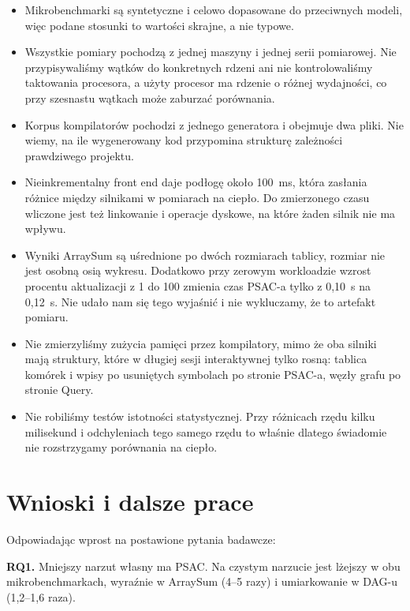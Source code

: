 \documentclass[11pt,a4paper]{article}
\begin{document}
\begin{itemize}
  \item Mikrobenchmarki są syntetyczne i celowo dopasowane do przeciwnych modeli,
        więc podane stosunki to wartości skrajne, a nie typowe.
  \item Wszystkie pomiary pochodzą z jednej maszyny i jednej serii pomiarowej.
        Nie przypisywaliśmy wątków do konkretnych rdzeni ani nie kontrolowaliśmy
        taktowania procesora, a użyty procesor ma rdzenie o różnej wydajności,
        co przy szesnastu wątkach może zaburzać porównania.
  \item Korpus kompilatorów pochodzi z jednego generatora i obejmuje dwa pliki.
        Nie wiemy, na ile wygenerowany kod przypomina strukturę zależności
        prawdziwego projektu.
  \item Nieinkrementalny front end daje podłogę około 100~ms, która zasłania
        różnice między silnikami w pomiarach na ciepło. Do zmierzonego czasu
        wliczone jest też linkowanie i operacje dyskowe, na które żaden silnik
        nie ma wpływu.
  \item Wyniki ArraySum są uśrednione po dwóch rozmiarach tablicy, rozmiar nie
        jest osobną osią wykresu. Dodatkowo przy zerowym workloadzie wzrost
        procentu aktualizacji z 1 do 100 zmienia czas PSAC-a tylko z 0,10~s na
        0,12~s. Nie udało nam się tego wyjaśnić i nie wykluczamy, że to artefakt
        pomiaru.
  \item Nie zmierzyliśmy zużycia pamięci przez kompilatory, mimo że oba silniki
        mają struktury, które w długiej sesji interaktywnej tylko rosną: tablica
        komórek i wpisy po usuniętych symbolach po stronie PSAC-a, węzły grafu po
        stronie Query.
  \item Nie robiliśmy testów istotności statystycznej. Przy różnicach rzędu kilku
        milisekund i odchyleniach tego samego rzędu to właśnie dlatego świadomie
        nie rozstrzygamy porównania na ciepło.
\end{itemize}

\section{Wnioski i dalsze prace}
\label{sec:wnioski}

Odpowiadając wprost na postawione pytania badawcze:

\textbf{RQ1.} Mniejszy narzut własny ma PSAC. Na czystym narzucie jest lżejszy
w obu mikrobenchmarkach, wyraźnie w ArraySum (4--5 razy) i umiarkowanie
w DAG-u (1,2--1,6 raza).
\end{document}
